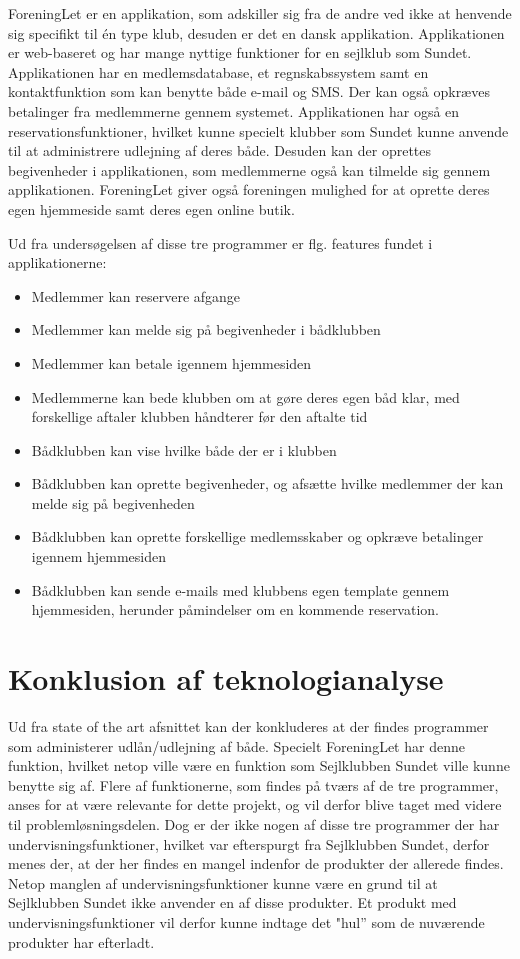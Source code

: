 ForeningLet er en applikation, som adskiller sig fra de andre ved ikke at henvende sig specifikt til én type klub, desuden er det en dansk applikation. 
Applikationen er web-baseret og har mange nyttige funktioner for en sejlklub som Sundet. 
Applikationen har en medlemsdatabase, et regnskabssystem samt en kontaktfunktion som kan benytte både e-mail og SMS. 
Der kan også opkræves betalinger fra medlemmerne gennem systemet. 
Applikationen har også en reservationsfunktioner, hvilket kunne specielt klubber som Sundet kunne anvende til at administrere  udlejning af deres både. 
Desuden kan der oprettes begivenheder i applikationen, som medlemmerne også kan tilmelde sig gennem applikationen. ForeningLet giver også foreningen mulighed for at oprette deres egen hjemmeside samt deres egen online butik.


Ud fra undersøgelsen af disse tre programmer er flg. features fundet i applikationerne:

\begin{itemize}
  \item Medlemmer kan reservere afgange
  \item Medlemmer kan melde sig på begivenheder i bådklubben
  \item Medlemmer kan betale igennem hjemmesiden
  \item Medlemmerne kan bede klubben om at gøre deres egen båd klar, med forskellige aftaler klubben håndterer
        før den aftalte tid
  \item Bådklubben kan vise hvilke både der er i klubben
  \item Bådklubben kan oprette begivenheder, og afsætte hvilke medlemmer der kan melde sig på begivenheden
  \item Bådklubben kan oprette forskellige medlemsskaber og opkræve betalinger igennem hjemmesiden
  \item Bådklubben kan sende e-mails med klubbens egen template gennem hjemmesiden, herunder påmindelser om en
        kommende reservation.
\end{itemize}
\section{Konklusion af teknologianalyse}

Ud fra state of the art afsnittet kan der konkluderes at der findes programmer som administerer udlån/udlejning af både.
Specielt ForeningLet har denne funktion, hvilket netop ville være en funktion som Sejlklubben Sundet ville kunne benytte sig af.
Flere af funktionerne, som findes på tværs af de tre programmer, anses for at være relevante for dette projekt, og vil derfor blive taget med videre til problemløsningsdelen.
Dog er der ikke nogen af disse tre programmer der har undervisningsfunktioner, hvilket var efterspurgt fra Sejlklubben Sundet, derfor menes der, at der her findes en mangel indenfor de produkter der allerede findes.
Netop manglen af undervisningsfunktioner kunne være en grund til at Sejlklubben Sundet ikke anvender en af disse produkter.
Et produkt med undervisningsfunktioner vil derfor kunne indtage det "hul'' som de nuværende produkter har efterladt.


